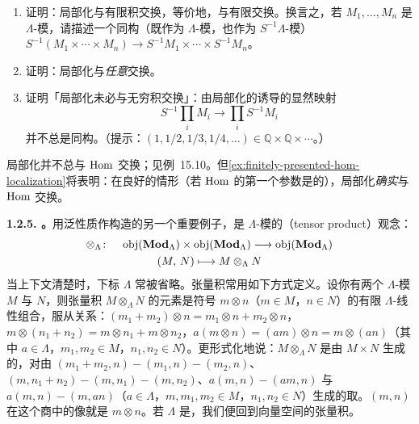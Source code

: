 \begin{exercise}\label{ex:localization-direct-sums-products}
\begin{enumerate}[label=(\alph*)]
\item 证明：局部化与有限积交换，等价地，与有限\trDirectSum{}交换。换言之，若 $M_1,\dots,M_n$ 是 $\Lambda$-模，请描述一个同构（既作为 $\Lambda$-模，也作为 $S^{-1}\Lambda$-模）$S^{-1}(M_1\times\cdots\times M_n)\to S^{-1}M_1\times\cdots\times S^{-1}M_n$。
\item 证明：局部化与\emph{任意}\trDirectSum{}交换。
\item 证明「局部化未必与无穷积交换」：由局部化的\trUniversalProperty{}诱导的显然映射
\[
S^{-1}\prod_i M_i\longrightarrow\prod_i S^{-1}M_i
\]
并不总是同构。（提示：$(1,1/2,1/3,1/4,\dots)\in\mathbb{Q}\times\mathbb{Q}\times\cdots$。）
\end{enumerate}
\end{exercise}

\begin{remark}\label{thm:hom-does-not-localize}
局部化并不总与 $\operatorname{Hom}$ 交换；见例~15.10。但\cref{ex:finitely-presented-hom-localization}将表明：在良好的情形（若 $\operatorname{Hom}$ 的第一个参数是\emph{\trFinitelyPresented}的），局部化\emph{确实}与 $\operatorname{Hom}$ 交换。
\end{remark}

\textbf{1.2.5. \trTensorProduct。}\quad 用泛性质作构造的另一个重要例子，是 $\Lambda$-模的\textbf{\trTensorProduct}（tensor product）观念：
\[
\begin{gathered}
\otimes_\Lambda\colon\quad \operatorname{obj}(\mathbf{Mod}_{\Lambda})\times\operatorname{obj}(\mathbf{Mod}_{\Lambda})\longrightarrow\operatorname{obj}(\mathbf{Mod}_{\Lambda})\\
(M,\,N)\longmapsto M\otimes_\Lambda N
\end{gathered}
\]
当上下文清楚时，下标 $\Lambda$ 常被省略。张量积常用如下方式定义。设你有两个 $\Lambda$-模 $M$ 与 $N$，则张量积 $M\otimes_\Lambda N$ 的元素是符号 $m\otimes n$（$m\in M$，$n\in N$）的有限 $\Lambda$-线性组合，服从关系：$(m_1+m_2)\otimes n=m_1\otimes n+m_2\otimes n$，$m\otimes(n_1+n_2)=m\otimes n_1+m\otimes n_2$，$a(m\otimes n)=(am)\otimes n=m\otimes(an)$（其中 $a\in\Lambda$，$m_1,m_2\in M$，$n_1,n_2\in N$）。更形式化地说：$M\otimes_\Lambda N$ 是由 $M\times N$ 生成的\trFreeModule，对由 $(m_1+m_2,n)-(m_1,n)-(m_2,n)$、$(m,n_1+n_2)-(m,n_1)-(m,n_2)$、$a(m,n)-(am,n)$ 与 $a(m,n)-(m,an)$（$a\in\Lambda$，$m,m_1,m_2\in M$，$n_1,n_2\in N$）生成的\trSubmodule{}取\trQuotient。$(m,n)$ 在这个商中的像就是 $m\otimes n$。若 $\Lambda$ 是\trField，我们便回到向量空间的张量积。

